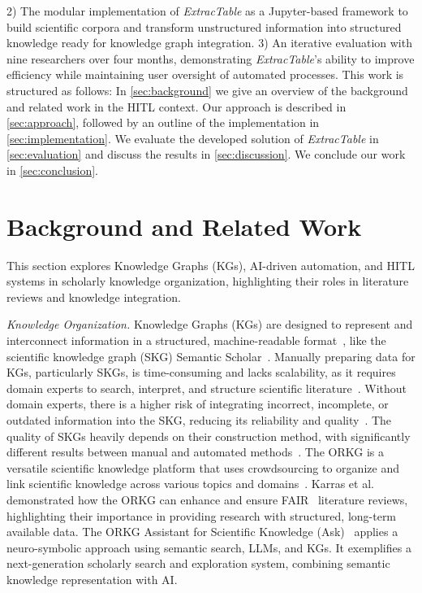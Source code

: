 \documentclass[runningheads]{llncs}
\newcommand*{\secref}[1]{\hyperref[{#1}]{\autoref*{#1}}}
\begin{document}
2) The modular implementation of \textit{ExtracTable} as a Jupyter-based framework to build scientific corpora and transform unstructured information into structured knowledge ready for knowledge graph integration.
3) An iterative evaluation with nine researchers over four months, demonstrating \textit{ExtracTable}’s ability to improve efficiency while maintaining user oversight of automated processes.
This work is %
structured as follows:
In \secref{sec:background} we give an overview of the background and related work in the HITL context. Our approach is described in \secref{sec:approach}, followed by an outline of the implementation in \secref{sec:implementation}.
We evaluate the developed solution of \textit{ExtracTable} in \secref{sec:evaluation} and discuss the results in \secref{sec:discussion}. 
We conclude our work in \secref{sec:conclusion}.


\section{Background and Related Work\label{sec:background}}
This section explores Knowledge Graphs (KGs), AI-driven automation, and HITL systems in scholarly knowledge organization, highlighting their roles in literature reviews and knowledge integration.\vspace{0.1cm}

\noindent
\textit{Knowledge Organization.\label{sec:background_knowledge}}
Knowledge Graphs (KGs) are designed to represent and interconnect information in a structured, machine-readable format~\cite{vahdati_unveiling_2018}, like the scientific knowledge graph (SKG) Semantic Scholar~\cite{Wade2022TheSemanticScholar}.
Manually preparing data for KGs, particularly SKGs, is time-consuming and lacks scalability, as it requires domain experts to search, interpret, and structure scientific literature~\cite{hofer_construction_2024}.
Without domain experts, there is a higher risk of integrating incorrect, incomplete, or outdated information into the SKG, reducing its reliability and quality~\cite{jain_domain-specific_2020}.
The quality of SKGs heavily depends on their construction method, with significantly different results between manual and automated methods~\cite{huaman_knowledge_2022}.
The ORKG is a versatile scientific knowledge platform that uses crowdsourcing to organize and link scientific knowledge across various topics and domains~\cite{Auer.2025}.
Karras et al.~\cite{karras_divide_2023,karras_kg-empire_2024,Karras2025,Karras.2024} demonstrated how the ORKG can enhance and ensure FAIR~\cite{wilkinson_fair_2016} literature reviews, highlighting their importance in providing research with structured, long-term available data.
The ORKG Assistant for Scientific Knowledge (Ask)~\cite{Auer.2025} applies a neuro-symbolic approach using semantic search, LLMs, and KGs.
It exemplifies a next-generation scholarly search and exploration system, combining semantic knowledge representation with AI.\vspace{0.1cm}
\end{document}
